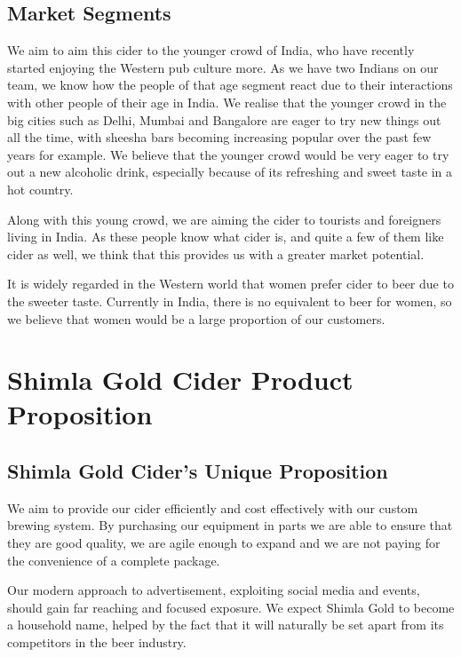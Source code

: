 \documentclass[11pt]{article}
\begin{document}
  \subsection{Market Segments}
We aim to aim this cider to the younger crowd of India, who have recently
started enjoying the Western pub culture more. As we have two Indians on our
team, we know how the people of that age segment react due to their interactions
with other people of their age in India. We realise that the younger crowd in
the big cities such as Delhi, Mumbai and Bangalore are eager to try new things
out all the time, with sheesha bars becoming increasing popular over the past
few years for example. We believe that the younger crowd would be very eager to
try out a new alcoholic drink, especially because of its refreshing and sweet
taste in a hot country.

Along with this young crowd, we are aiming the cider to tourists and foreigners
living in India. As these people know what cider is, and quite a few of them
like cider as well, we think that this provides us with a greater market
potential.

It is widely regarded in the Western world that women prefer cider to beer due
to the sweeter taste. Currently in India, there is no equivalent to beer for
women, so we believe that women would be a large proportion of our customers.

\newpage
\section{Shimla Gold Cider Product Proposition}

\subsection{Shimla Gold Cider's Unique Proposition}
We aim to provide our cider efficiently and cost effectively with our custom
brewing system. By purchasing our equipment in parts we are able to ensure that
they are good quality, we are agile enough to expand and we are not paying for
the convenience of a complete package.

Our modern approach to advertisement, exploiting social media and events, should
gain far reaching and focused exposure. We expect Shimla Gold to become a
household name, helped by the fact that it will naturally be set apart from its
competitors in the beer industry.
\end{document}
